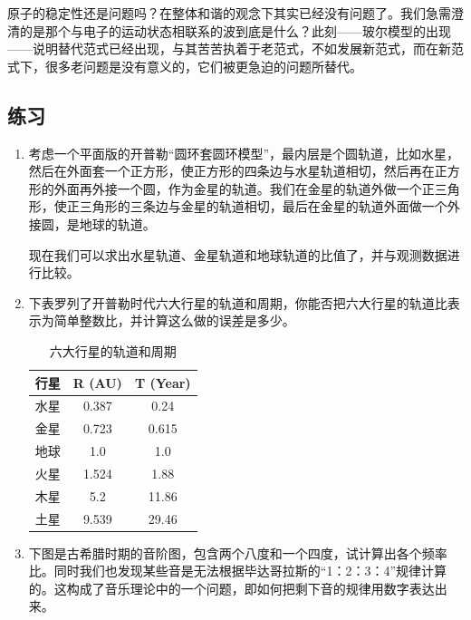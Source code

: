 原子的稳定性还是问题吗？在整体和谐的观念下其实已经没有问题了。我们急需澄清的是那个与电子的运动状态相联系的波到底是什么？此刻——玻尔模型的出现——说明替代范式已经出现，与其苦苦执着于老范式，不如发展新范式，而在新范式下，很多老问题是没有意义的，它们被更急迫的问题所替代。

\subsection*{练习}

\begin{enumerate}
\item 

考虑一个平面版的开普勒“圆环套圆环模型”，最内层是个圆轨道，比如水星，然后在外面套一个正方形，使正方形的四条边与水星轨道相切，然后再在正方形的外面再外接一个圆，作为金星的轨道。我们在金星的轨道外做一个正三角形，使正三角形的三条边与金星的轨道相切，最后在金星的轨道外面做一个外接圆，是地球的轨道。

现在我们可以求出水星轨道、金星轨道和地球轨道的比值了，并与观测数据进行比较。

\item

下表罗列了开普勒时代六大行星的轨道和周期，你能否把六大行星的轨道比表示为简单整数比，并计算这么做的误差是多少。

\begin{table}[htdp]
\caption{六大行星的轨道和周期}
\begin{center}
\begin{tabular}{|c|c|c|}
\hline
行星 & R (AU) & T (Year) \\
\hline
水星 & 0.387 & 0.24  \\
金星 & 0.723 & 0.615 \\
地球 & 1.0 & 1.0 \\
火星 & 1.524 & 1.88 \\
木星 & 5.2 & 11.86 \\
土星 & 9.539 & 29.46 \\
\hline
\end{tabular}
\end{center}
\label{default}
\end{table}%

\item

下图是古希腊时期的音阶图，包含两个八度和一个四度，试计算出各个频率比。同时我们也发现某些音是无法根据毕达哥拉斯的“1：2：3：4”规律计算的。这构成了音乐理论中的一个问题，即如何把剩下音的规律用数字表达出来。


\end{enumerate}

